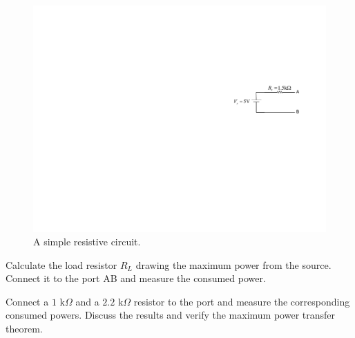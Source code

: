 \documentclass[11pt]{article}
\begin{document}

\begin{question}


    \begin{figure}[H]
        \centering
        \includegraphics[scale=1.2,angle=0]{Fig/cir3.pdf}
        \caption{A simple resistive circuit.} \label{fig:cir3}
    \end{figure}


    \begin{subquestion}{Calculate the load resistor $R_L$ drawing the maximum power from the source. Connect it to the port AB and measure the consumed power.}
        \answer{}
    \end{subquestion}

    \begin{subquestion}{Connect a $1$ k$\Omega$ and a $2.2$ k$\Omega$ resistor to the port and measure the corresponding consumed powers. Discuss the results and verify the maximum power transfer theorem.}
        \answer{}
    \end{subquestion}


\end{question}

\end{document}
